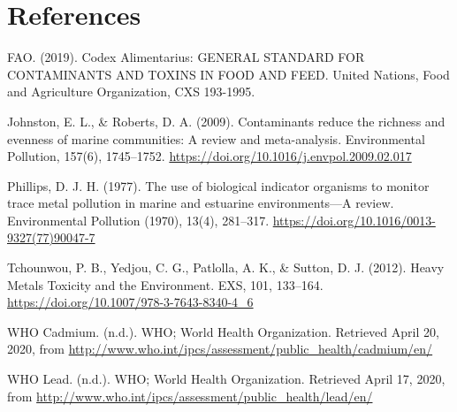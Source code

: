 \documentclass[
  12pt,
]{article}
\begin{document}
\newpage

\hypertarget{references}{%
\section{References}\label{references}}

FAO. (2019). Codex Alimentarius: GENERAL STANDARD FOR CONTAMINANTS AND
TOXINS IN FOOD AND FEED. United Nations, Food and Agriculture
Organization, CXS 193-1995.

Johnston, E. L., \& Roberts, D. A. (2009). Contaminants reduce the
richness and evenness of marine communities: A review and meta-analysis.
Environmental Pollution, 157(6), 1745--1752.
\url{https://doi.org/10.1016/j.envpol.2009.02.017}

Phillips, D. J. H. (1977). The use of biological indicator organisms to
monitor trace metal pollution in marine and estuarine environments---A
review. Environmental Pollution (1970), 13(4), 281--317.
\url{https://doi.org/10.1016/0013-9327(77)90047-7}

Tchounwou, P. B., Yedjou, C. G., Patlolla, A. K., \& Sutton, D. J.
(2012). Heavy Metals Toxicity and the Environment. EXS, 101, 133--164.
\url{https://doi.org/10.1007/978-3-7643-8340-4_6}

WHO \textbar{} Cadmium. (n.d.). WHO; World Health Organization.
Retrieved April 20, 2020, from
\url{http://www.who.int/ipcs/assessment/public_health/cadmium/en/}

WHO \textbar{} Lead. (n.d.). WHO; World Health Organization. Retrieved
April 17, 2020, from
\url{http://www.who.int/ipcs/assessment/public_health/lead/en/}
\end{document}
